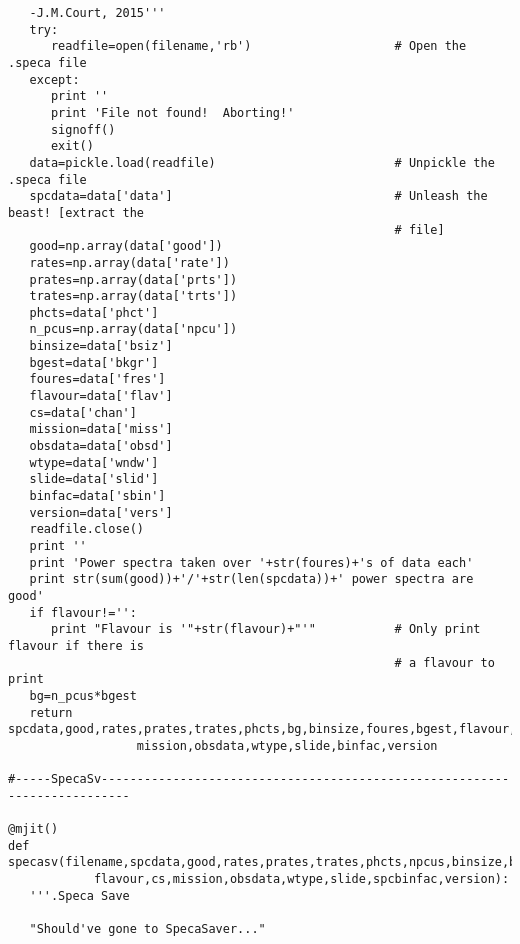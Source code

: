 \begin{verbatim}
   -J.M.Court, 2015'''
   try:
      readfile=open(filename,'rb')                    # Open the .speca file
   except:
      print ''
      print 'File not found!  Aborting!'
      signoff()
      exit()
   data=pickle.load(readfile)                         # Unpickle the .speca file
   spcdata=data['data']                               # Unleash the beast! [extract the
                                                      # file]
   good=np.array(data['good'])
   rates=np.array(data['rate'])
   prates=np.array(data['prts'])
   trates=np.array(data['trts'])
   phcts=data['phct']
   n_pcus=np.array(data['npcu'])
   binsize=data['bsiz']
   bgest=data['bkgr']
   foures=data['fres']
   flavour=data['flav']
   cs=data['chan']
   mission=data['miss']
   obsdata=data['obsd']
   wtype=data['wndw']
   slide=data['slid']
   binfac=data['sbin']
   version=data['vers']
   readfile.close()
   print ''
   print 'Power spectra taken over '+str(foures)+'s of data each'
   print str(sum(good))+'/'+str(len(spcdata))+' power spectra are good'
   if flavour!='':
      print "Flavour is '"+str(flavour)+"'"           # Only print flavour if there is
                                                      # a flavour to print
   bg=n_pcus*bgest
   return spcdata,good,rates,prates,trates,phcts,bg,binsize,foures,bgest,flavour,cs,
                  mission,obsdata,wtype,slide,binfac,version

#-----SpecaSv--------------------------------------------------------------------------

@mjit()
def specasv(filename,spcdata,good,rates,prates,trates,phcts,npcus,binsize,bgest,foures,
            flavour,cs,mission,obsdata,wtype,slide,spcbinfac,version):
   '''.Speca Save

   "Should've gone to SpecaSaver..."


\end{verbatim}
